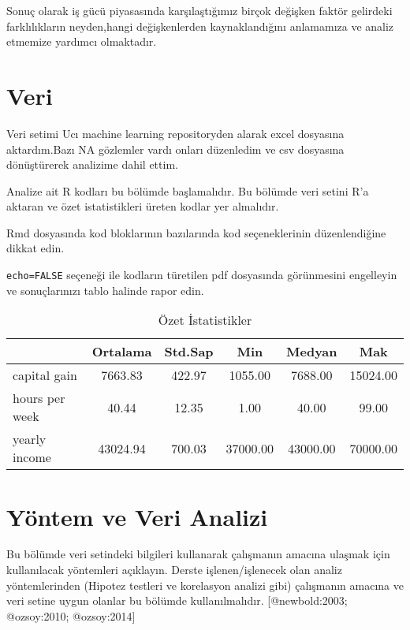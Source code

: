 \documentclass[
  12pt,
]{article}
\begin{document}
Sonuç olarak iş gücü piyasasında karşılaştığımız birçok değişken faktör gelirdeki farklılıkların neyden,hangi değişkenlerden kaynaklandığını anlamamıza ve analiz etmemize yardımcı olmaktadır.

\hypertarget{veri}{%
\section{Veri}\label{veri}}

Veri setimi Ucı machine learning repositoryden alarak excel dosyasına aktardım.Bazı NA gözlemler vardı onları düzenledim ve csv dosyasına dönüştürerek analizime dahil ettim.

Analize ait R kodları bu bölümde başlamalıdır. Bu bölümde veri setini R'a aktaran ve özet istatistikleri üreten kodlar yer almalıdır.

Rmd dosyasında kod bloklarının bazılarında kod seçeneklerinin düzenlendiğine dikkat edin.

\texttt{echo=FALSE} seçeneği ile kodların türetilen pdf dosyasında görünmesini engelleyin ve sonuçlarınızı tablo halinde rapor edin.

\begin{table}[ht]
\centering
\caption{Özet İstatistikler} 
\label{tab:ozet}
\begin{tabular}{lccccc}
  \toprule
 & Ortalama & Std.Sap & Min & Medyan & Mak \\ 
  \midrule
capital gain & 7663.83 & 422.97 & 1055.00 & 7688.00 & 15024.00 \\ 
  hours per week & 40.44 & 12.35 & 1.00 & 40.00 & 99.00 \\ 
  yearly income & 43024.94 & 700.03 & 37000.00 & 43000.00 & 70000.00 \\ 
   \bottomrule
\end{tabular}
\end{table}

\hypertarget{yuxf6ntem-ve-veri-analizi}{%
\section{Yöntem ve Veri Analizi}\label{yuxf6ntem-ve-veri-analizi}}

Bu bölümde veri setindeki bilgileri kullanarak çalışmanın amacına ulaşmak için kullanılacak yöntemleri açıklayın. Derste işlenen/işlenecek olan analiz yöntemlerinden (Hipotez testleri ve korelasyon analizi gibi) çalışmanın amacına ve veri setine uygun olanlar bu bölümde kullanılmalıdır. {[}@newbold:2003; @ozsoy:2010; @ozsoy:2014{]}
\end{document}
